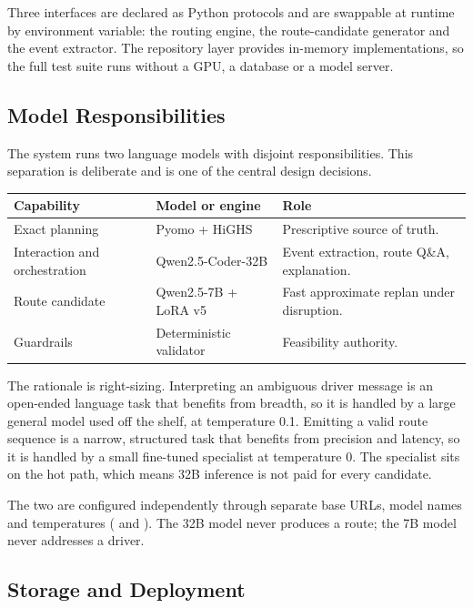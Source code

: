 \documentclass[11pt,a4paper]{article}
\newcommand{\toprule}{\hline}
\newcommand{\midrule}{\hline}
\newcommand{\bottomrule}{\hline}
\begin{document}
Three interfaces are declared as Python protocols and are swappable at runtime by environment
variable: the routing engine, the route-candidate generator and the event extractor. The repository
layer provides in-memory implementations, so the full test suite runs without a GPU, a database or a
model server.

\subsection{Model Responsibilities}
\label{sec:models}

The system runs two language models with disjoint responsibilities. This separation is deliberate
and is one of the central design decisions.

\begin{table}[h]
\centering
\begin{tabular}{lll}
\toprule
Capability & Model or engine & Role \\
\midrule
Exact planning & Pyomo + HiGHS & Prescriptive source of truth. \\
Interaction and orchestration & Qwen2.5-Coder-32B & Event extraction, route Q\&A, explanation. \\
Route candidate & Qwen2.5-7B + LoRA v5 & Fast approximate replan under disruption. \\
Guardrails & Deterministic validator & Feasibility authority. \\
\bottomrule
\end{tabular}
\end{table}

The rationale is right-sizing. Interpreting an ambiguous driver message is an open-ended language
task that benefits from breadth, so it is handled by a large general model used off the shelf, at
temperature 0.1. Emitting a valid route sequence is a narrow, structured task that benefits from
precision and latency, so it is handled by a small fine-tuned specialist at temperature 0. The
specialist sits on the hot path, which means 32B inference is not paid for every candidate.

The two are configured independently through separate base URLs, model names and temperatures
( and ). The 32B model never
produces a route; the 7B model never addresses a driver.

\subsection{Storage and Deployment}
\end{document}
